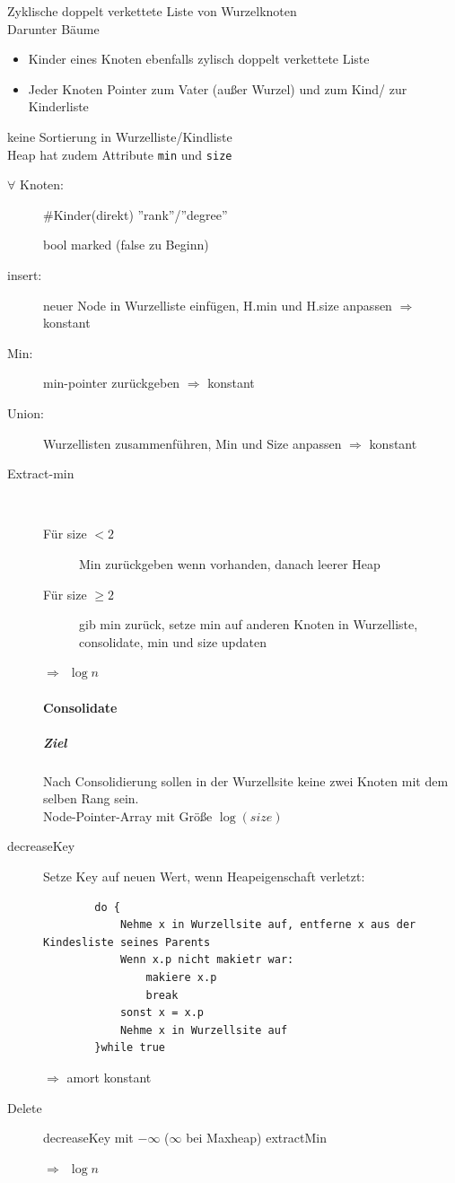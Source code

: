 \documentclass[a4paper,11pt,twoside]{scrartcl}
\begin{document}
Zyklische doppelt verkettete Liste von Wurzelknoten\\
Darunter Bäume
\begin{itemize}
	\item Kinder eines Knoten ebenfalls zylisch doppelt verkettete Liste
	\item Jeder Knoten Pointer zum Vater (außer Wurzel) und zum Kind/ zur Kinderliste
\end{itemize}
keine Sortierung in Wurzelliste/Kindliste\\
Heap hat zudem Attribute \texttt{min} und \texttt{size}
\begin{description}
	\item[$\forall$ Knoten:]  $\#$Kinder(direkt) ''rank''/''degree''
	\item[ ]bool marked (false zu Beginn)
\end{description}
\begin{description}
	\item[insert:] neuer Node in Wurzelliste einfügen, H.min und H.size anpassen $\Rightarrow$ konstant
	\item[Min:] min-pointer zurückgeben $\Rightarrow$ konstant
	\item[Union:] Wurzellisten zusammenführen, Min und Size anpassen $\Rightarrow$ konstant
	\item[Extract-min] $ $\\ \begin{description}
		\item[Für size $< 2$] Min zurückgeben wenn vorhanden, danach leerer Heap
		\item[Für size $\geq 2$] gib min zurück, setze min auf anderen Knoten in Wurzelliste, consolidate, min und size updaten
	\end{description} $\Rightarrow~~\log n$ 
	
	\paragraph{Consolidate}
	\subparagraph{Ziel}
	Nach Consolidierung sollen in der Wurzellsite keine zwei Knoten mit dem selben Rang sein.\\
	Node-Pointer-Array mit Größe $\log(size)$
	\item[decreaseKey] Setze Key auf neuen Wert, wenn Heapeigenschaft verletzt:
	\begin{lstlisting}
		do {
			Nehme x in Wurzellsite auf, entferne x aus der Kindesliste seines Parents
			Wenn x.p nicht makietr war:
				makiere x.p
				break
			sonst x = x.p
			Nehme x in Wurzellsite auf
		}while true
	\end{lstlisting}
	$\Rightarrow$ amort konstant
	\item[Delete] \begin{lstlsiting}
		decreaseKey mit $-\infty$ ($\infty$ bei Maxheap)
		extractMin
	\end{lstlsiting}
	$\Rightarrow~~\log n$ 
\end{description}
\end{document}
